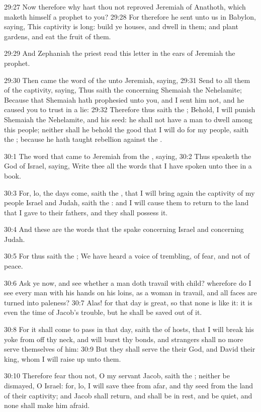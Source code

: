 29:27 Now therefore why hast thou not reproved Jeremiah of Anathoth,
which maketh himself a prophet to you?  29:28 For therefore he sent
unto us in Babylon, saying, This captivity is long: build ye houses,
and dwell in them; and plant gardens, and eat the fruit of them.

29:29 And Zephaniah the priest read this letter in the ears of
Jeremiah the prophet.

29:30 Then came the word of the \LORD unto Jeremiah, saying, 29:31 Send
to all them of the captivity, saying, Thus saith the \LORD concerning
Shemaiah the Nehelamite; Because that Shemaiah hath prophesied unto
you, and I sent him not, and he caused you to trust in a lie: 29:32
Therefore thus saith the \LORD; Behold, I will punish Shemaiah the
Nehelamite, and his seed: he shall not have a man to dwell among this
people; neither shall he behold the good that I will do for my people,
saith the \LORD; because he hath taught rebellion against the \LORD.

30:1 The word that came to Jeremiah from the \LORD, saying, 30:2 Thus
speaketh the \LORD God of Israel, saying, Write thee all the words that
I have spoken unto thee in a book.

30:3 For, lo, the days come, saith the \LORD, that I will bring again
the captivity of my people Israel and Judah, saith the \LORD: and I
will cause them to return to the land that I gave to their fathers,
and they shall possess it.

30:4 And these are the words that the \LORD spake concerning Israel and
concerning Judah.

30:5 For thus saith the \LORD; We have heard a voice of trembling, of
fear, and not of peace.

30:6 Ask ye now, and see whether a man doth travail with child?
wherefore do I see every man with his hands on his loins, as a woman
in travail, and all faces are turned into paleness?  30:7 Alas! for
that day is great, so that none is like it: it is even the time of
Jacob's trouble, but he shall be saved out of it.

30:8 For it shall come to pass in that day, saith the \LORD of hosts,
that I will break his yoke from off thy neck, and will burst thy
bonds, and strangers shall no more serve themselves of him: 30:9 But
they shall serve the \LORD their God, and David their king, whom I will
raise up unto them.

30:10 Therefore fear thou not, O my servant Jacob, saith the \LORD;
neither be dismayed, O Israel: for, lo, I will save thee from afar,
and thy seed from the land of their captivity; and Jacob shall return,
and shall be in rest, and be quiet, and none shall make him afraid.

